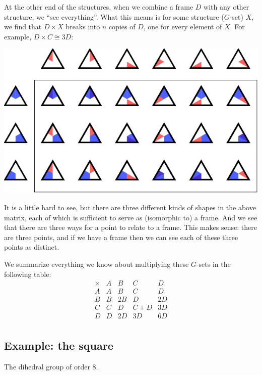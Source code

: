 \documentclass[11pt,oneside]{article}
\newcommand{\thinplus}{\!+\!}
\begin{document}
At the other end of the structures, 
when we combine a frame $D$ with any other structure,
we ``see everything''.
What this means is 
for some structure ($G$-set) $X$, we find that $D\times X$
breaks into $n$ copies of $D$, one for every element of $X$.
For example, $D\times C\cong 3D:$
\begin{center}
\includegraphics[]{pic-triangle-point-frame-matrix.pdf} 
\end{center}
It is a little hard to see, but there are three different
kinds of shapes in the above matrix, 
each of which is sufficient to serve as (isomorphic to) a frame.
And we see that there are three ways for a point to relate to
a frame. This makes sense: there are three points, and if we
have a frame then we can see each of these three points as distinct.

We summarize everything we know about 
multiplying these $G$-sets in the following table:
$$
\begin{array}{r|rrrr}
\times & A & B & C & D \\
\hline
A & A & B & C & D \\
B & B & 2B & D & 2D \\
C & C & D & C\thinplus D & 3D \\
D & D & 2D & 3D & 6D \\
\end{array}
$$

\subsection{Example: the square}

The dihedral group of order 8.
\end{document}
